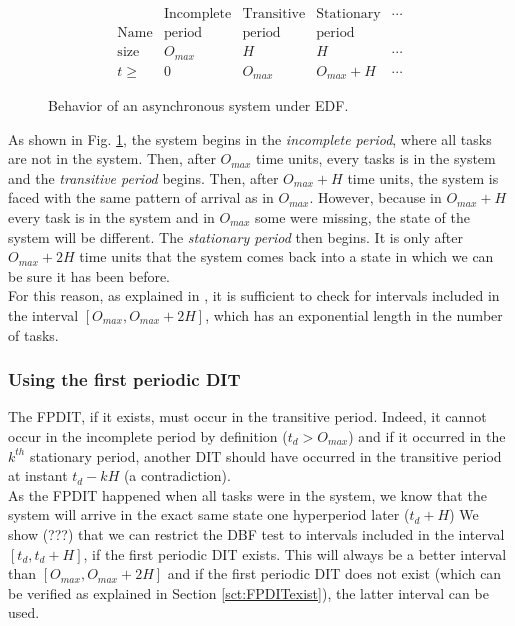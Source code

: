 \documentclass[times, 10pt,twocolumn, a4paper]{article}
\begin{document}
\begin{figure}[h]
	\[
		\begin{array}{r||c|c|c|l}
			& \text{Incomplete} & \text{Transitive} & \text{Stationary} & \cdots \\
			\text{Name} & \text{period} & \text{period} & \text{period}  & \\
			\hline
			\text{size} & O_{max} & H & H & \cdots \\
			\hline
			t \geqslant & 0 & O_{max} & O_{max} + H & \cdots
		\end{array}
	\]
	\begin{center}
	\caption{Behavior of an asynchronous system under EDF.}
	\label{fig:asyncBehavior}
	\end{center}
\end{figure}

As shown in Fig. \ref{fig:asyncBehavior}, the system begins in the \emph{incomplete period}, where all tasks are not in the system. Then, after $O_{max}$ time units, every tasks is in the system and the \emph{transitive period} begins. Then, after $O_{max} + H$ time units, the system is faced with the same pattern of arrival as in $O_{max}$. However, because in $O_{max} + H$ every task is in the system and in $O_{max}$ some were missing, the state of the system will be different. The \emph{stationary period} then begins. It is only after $O_{max} + 2H$ time units that the system comes back into a state in which we can be sure it has been before.\\

For this reason, as explained in \cite{leung1982complexity}, it is sufficient to check for intervals included in the interval $[O_{max}, O_{max} + 2H]$, which has an exponential length in the number of tasks.

\subsubsection{Using the first periodic DIT}

The FPDIT, if it exists, must occur in the transitive period. Indeed, it cannot occur in the incomplete period by definition ($t_d > O_{max}$) and if it occurred in the $k^{th}$ stationary period, another DIT should have occurred in the transitive period at instant $t_d - k H$ (a contradiction).\\

As the FPDIT happened when all tasks were in the system, we know that the system will arrive in the exact same state one hyperperiod later ($t_d + H$)
We show (???) that we can restrict the DBF test to intervals included in the interval $[t_d, t_d + H]$, if the first periodic DIT exists. This will always be a better interval than $[O_{max}, O_{max} + 2H]$ and if the first periodic DIT does not exist (which can be verified as explained in Section \ref{sct:FPDITexist}), the latter interval can be used.\\
\end{document}
